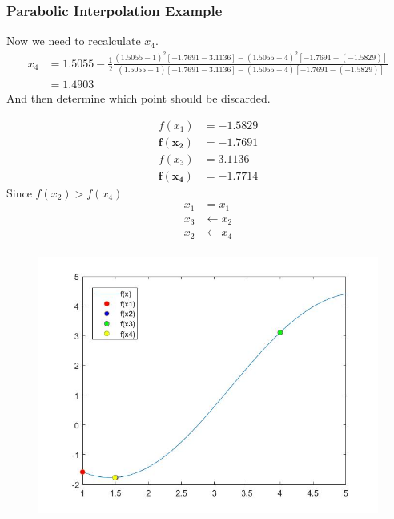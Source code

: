 \documentclass{if-beamer}
\begin{document}
\begin{frame}[t]
	\frametitle{Parabolic Interpolation Example}
	Now we need to recalculate $x_4$.
	\begin{align*}
		 x_4 &= 1.5055-\frac{1}{2}\frac{(1.5055-1)^2[-1.7691-3.1136]-(1.5055-4)^2[-1.7691-(-1.5829)]}{(1.5055-1)[-1.7691-3.1136]-(1.5055-4)[-1.7691-(-1.5829)]}\\
		 &=1.4903
	\end{align*}	
	And then determine which point should be discarded.\\
	\begin{minipage}{0.5\textwidth}
		\begin{align*}
			f(x_1) &= -1.5829\\
			\mathbf{f(x_2)} &= \mathbf{-1.7691}\\
			f(x_3) &= 3.1136\\
			\mathbf{f(x_4)} &= \mathbf{-1.7714}
		\end{align*}
		Since $f(x_2) > f(x_4)$
		\begin{align*}
		x_1 &= x_1\\
		x_3 &\leftarrow x_2\\
		x_2 &\leftarrow x_4\\
		\end{align*}
	\end{minipage}
	\begin{minipage}{0.5\textwidth}
		\begin{figure}
			\centering
			\includegraphics[width=.9\textwidth]{figures/plot4}
		\end{figure}
	\end{minipage}
\end{frame}
%
\end{document}
